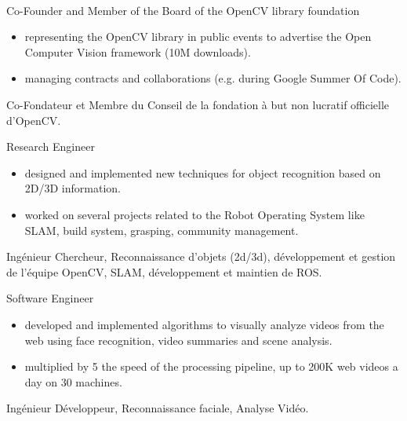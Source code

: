 \documentclass{article}
\begin{document}
\begin{llist}
\\
{
Co-Founder and Member of the Board of the OpenCV library foundation
\vspace{-0.33cm}
\begin{itemize}
 \item representing the OpenCV library in public events to advertise the Open Computer Vision framework (10M downloads).
 \item managing contracts and collaborations (e.g. during Google Summer Of Code).
\end{itemize}
}
{
Co-Fondateur et Membre du Conseil de la fondation \`{a} but non lucratif officielle d'OpenCV.
}

{
Research Engineer
\vspace{-0.33cm}
\begin{itemize}
 \item designed and implemented new techniques for object recognition based on 2D/3D information.
 \item worked on several projects related to the Robot Operating System like SLAM, build system, grasping, community 
management.
\end{itemize}
}
{
Ing\'{e}nieur Chercheur, Reconnaissance d'objets (2d/3d), d\'{e}veloppement et gestion de l'\'{e}quipe 
OpenCV, SLAM, d\'{e}veloppement et maintien de ROS.
}

{
Software Engineer
\vspace{-0.33cm}
\begin{itemize}
 \item developed and implemented algorithms to visually analyze videos from the web using face recognition, video 
summaries and scene analysis.
 \item multiplied by 5 the speed of the processing pipeline, up to 200K web videos a day on 30 machines.
\end{itemize}
}
{
Ing\'{e}nieur D\'{e}veloppeur, Reconnaissance faciale, Analyse
Vid\'{e}o.
}



\end{llist}
\end{document}
